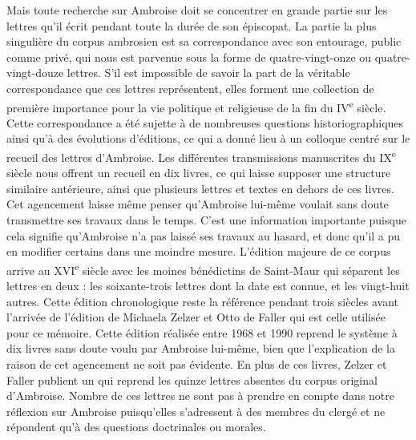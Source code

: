 \bigskip

Mais toute recherche sur Ambroise doit se concentrer en grande partie sur les lettres qu'il écrit pendant toute la durée de son épiscopat. La partie la plus singulière du corpus ambrosien est sa correspondance avec son entourage, public comme privé, qui nous est parvenue sous la forme de quatre-vingt-onze ou quatre-vingt-douze lettres. S'il est impossible de savoir la part de la véritable correspondance que ces lettres représentent, elles forment une collection de première importance pour la vie politique et religieuse de la fin du IV\textsuperscript{e} siècle. Cette correspondance a été sujette à de nombreuses questions historiographiques ainsi qu’à des évolutions d’éditions, ce qui a donné lieu à un colloque centré sur le recueil des lettres d’Ambroise\autocite{canellis_correspondance}. Les différentes transmissions manuscrites du IX\textsuperscript{e} siècle nous offrent un recueil en dix livres, ce qui laisse supposer une structure similaire antérieure, ainsi que plusieurs lettres et textes en dehors de ces livres. Cet agencement laisse même penser qu'Ambroise lui-même voulait sans doute transmettre ses travaux dans le temps. C'est une information importante puisque cela signifie qu'Ambroise n'a pas laissé ses travaux au hasard, et donc qu'il a pu en modifier certains dans une moindre mesure. L’édition majeure de ce corpus arrive au XVI\textsuperscript{e} siècle avec les moines bénédictins de Saint-Maur qui séparent les lettres en deux : les soixante-trois lettres dont la date est connue, et les vingt-huit autres. Cette édition chronologique reste la référence pendant trois siècles avant l’arrivée de l’édition de Michaela Zelzer et Otto de Faller qui est celle utilisée pour ce mémoire. Cette édition réalisée entre 1968 et 1990 reprend le système à dix livres sans doute voulu par Ambroise lui-même, bien que l'explication de la raison de cet agencement ne soit pas évidente. En plus de ces livres, Zelzer et Faller publient un  qui reprend les quinze lettres absentes du corpus original d’Ambroise. Nombre de ces lettres ne sont pas à prendre en compte dans notre réflexion sur Ambroise puisqu’elles s’adressent à des membres du clergé et ne répondent qu’à des questions doctrinales ou morales.

\bigskip

